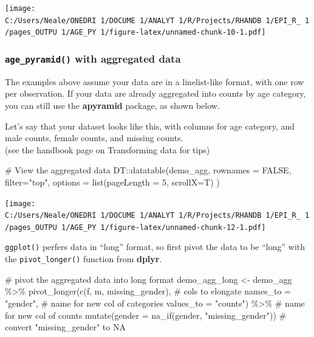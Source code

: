 \documentclass[
]{article}
\newenvironment{Shaded}{\begin{snugshade}}{\end{snugshade}}
\newcommand{\CommentTok}[1]{\textcolor[rgb]{0.50,0.62,0.50}{#1}}
\newcommand{\DataTypeTok}[1]{\textcolor[rgb]{0.87,0.87,0.75}{#1}}
\newcommand{\DecValTok}[1]{\textcolor[rgb]{0.86,0.86,0.80}{#1}}
\newcommand{\KeywordTok}[1]{\textcolor[rgb]{0.94,0.87,0.69}{#1}}
\newcommand{\NormalTok}[1]{\textcolor[rgb]{0.80,0.80,0.80}{#1}}
\newcommand{\OperatorTok}[1]{\textcolor[rgb]{0.94,0.94,0.82}{#1}}
\newcommand{\OtherTok}[1]{\textcolor[rgb]{0.94,0.94,0.56}{#1}}
\newcommand{\StringTok}[1]{\textcolor[rgb]{0.80,0.58,0.58}{#1}}
\begin{document}
\texttt{[image: C:/Users/Neale/ONEDRI~1/DOCUME~1/ANALYT~1/R/Projects/RHANDB~1/EPI\_R\_~1/pages\_OUTPU~1/AGE\_PY~1/figure-latex/unnamed-chunk-10-1.pdf]}

\hypertarget{age_pyramid-with-aggregated-data}{%
\subsubsection{\texorpdfstring{\texttt{age\_pyramid()} with aggregated
data}{age\_pyramid() with aggregated data}}\label{age_pyramid-with-aggregated-data}}

The examples above assume your data are in a linelist-like format, with
one row per observation. If your data are already aggregated into counts
by age category, you can still use the \textbf{apyramid} package, as
shown below.

Let's say that your dataset looks like this, with columns for age
category, and male counts, female counts, and missing counts.\\
(see the handbook page on Transforming data for tips)

\begin{Shaded}
\begin{Highlighting}[]
\CommentTok{\# View the aggregated data}
\NormalTok{DT}\OperatorTok{::}\KeywordTok{datatable}\NormalTok{(demo\_agg, }\DataTypeTok{rownames =} \OtherTok{FALSE}\NormalTok{, }\DataTypeTok{filter=}\StringTok{"top"}\NormalTok{, }\DataTypeTok{options =} \KeywordTok{list}\NormalTok{(}\DataTypeTok{pageLength =} \DecValTok{5}\NormalTok{, }\DataTypeTok{scrollX=}\NormalTok{T) )}
\end{Highlighting}
\end{Shaded}

\texttt{[image: C:/Users/Neale/ONEDRI~1/DOCUME~1/ANALYT~1/R/Projects/RHANDB~1/EPI\_R\_~1/pages\_OUTPU~1/AGE\_PY~1/figure-latex/unnamed-chunk-12-1.pdf]}

\texttt{ggplot()} perfers data in ``long'' format, so first pivot the
data to be ``long'' with the \texttt{pivot\_longer()} function from
\textbf{dplyr}.

\begin{Shaded}
\begin{Highlighting}[]
\CommentTok{\# pivot the aggregated data into long format}
\NormalTok{demo\_agg\_long \textless{}{-}}\StringTok{ }\NormalTok{demo\_agg }\OperatorTok{\%\textgreater{}\%}\StringTok{ }
\StringTok{  }\KeywordTok{pivot\_longer}\NormalTok{(}\KeywordTok{c}\NormalTok{(f, m, missing\_gender),            }\CommentTok{\# cols to elongate}
               \DataTypeTok{names\_to =} \StringTok{"gender"}\NormalTok{,                }\CommentTok{\# name for new col of categories}
               \DataTypeTok{values\_to =} \StringTok{"counts"}\NormalTok{) }\OperatorTok{\%\textgreater{}\%}\StringTok{           }\CommentTok{\# name for new col of counts}
\StringTok{  }\KeywordTok{mutate}\NormalTok{(}\DataTypeTok{gender =} \KeywordTok{na\_if}\NormalTok{(gender, }\StringTok{"missing\_gender"}\NormalTok{)) }\CommentTok{\# convert "missing\_gender" to NA}
\end{Highlighting}
\end{Shaded}
\end{document}

